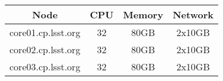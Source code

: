 \begin{center}
  \begin{tabular}{||c c c c||} 
    \hline
    Node & CPU & Memory & Network \\ [0.5ex] 
    \hline\hline
    core01.cp.lsst.org & 32 & 80GB & 2x10GB \\
    \hline
    core02.cp.lsst.org & 32 & 80GB & 2x10GB \\
    \hline
    core03.cp.lsst.org & 32 & 80GB & 2x10GB \\
    \hline
  \end{tabular}
\end{center}